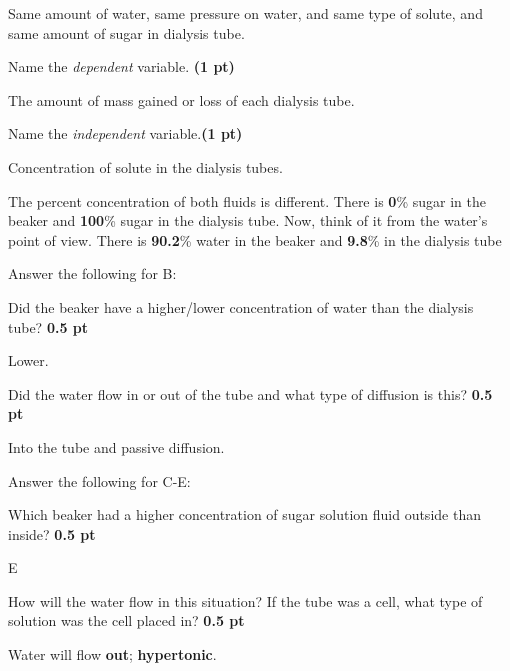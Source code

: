 \documentclass[12pt,a4paper]{article}
\begin{document}
\begin{enumerate}[font=\bfseries, wide, resume]
    Same amount of water, same pressure on water, and same type of solute, and same amount of sugar in dialysis tube.

    {\color{under}\item Name the \textit{dependent} variable. \textbf{(1 pt)}}

    The amount of mass gained or loss of each dialysis tube.

    {\color{under}\item Name the \textit{independent} variable.\textbf{(1 pt)}}

    Concentration of solute in the dialysis tubes.

    {\color{under} The percent concentration of both fluids is different. There is {\color{darkmodetext}\textbf{0}\%} sugar in the beaker and {\color{darkmodetext}\textbf{100}\%} sugar in the dialysis tube. Now, think of it from the water's point of  view. There is {\color{darkmodetext}\textbf{90.2}\%} water in the beaker and {\color{darkmodetext}\textbf{9.8}\%} in the dialysis tube}

    {\color{under}\item Answer the following for B:}
    \begin{enumerate}
        {\color{under}\item Did the beaker have a higher/lower concentration of water than the dialysis tube? \textbf{0.5 pt}}

        Lower.
\newpage 
        {\color{under}\item Did the water flow in or out of the tube and what type of diffusion is this? \textbf{0.5 pt}}

        Into the tube and passive diffusion.
    \end{enumerate}

    {\color{under}\item Answer the following for C-E:}
    \begin{enumerate}
        {\color{under}\item Which beaker had a higher concentration of sugar solution fluid outside than inside? \textbf{0.5 pt}}

        E

        {\color{under}\item How will the water flow in this situation? If the tube was a cell, what type of solution was the cell placed in? \textbf{0.5 pt}}

        Water will flow \textbf{out}; \textbf{hypertonic}. 
    \end{enumerate}


\end{enumerate}
\end{document}
